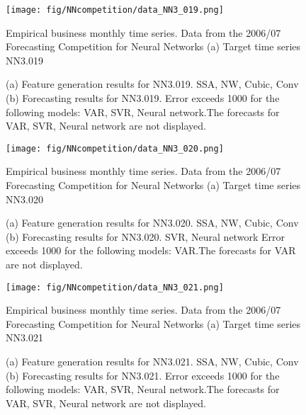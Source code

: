 \documentclass[12pt]{article}
\begin{document}
\begin{figure}
\centering
\texttt{[image: fig/NNcompetition/data\_NN3\_019.png]}
\caption{Empirical business monthly time series. Data from the 2006/07 Forecasting Competition for Neural Networks	(a) Target time series	NN3.019	}
\end{figure}


\begin{figure}
\centering
{}
\caption{(a)	Feature generation results for	NN3.019.	SSA, NW, Cubic, Conv	(b)	Forecasting results for	NN3.019.		Error exceeds 1000 for the following models: VAR, SVR, Neural network.The forecasts for VAR, SVR, Neural network are not displayed.	}
\end{figure}


\begin{figure}
\centering
\texttt{[image: fig/NNcompetition/data\_NN3\_020.png]}
\caption{Empirical business monthly time series. Data from the 2006/07 Forecasting Competition for Neural Networks	(a) Target time series	NN3.020	}
\end{figure}


\begin{figure}
\centering
{}
\caption{(a)	Feature generation results for	NN3.020.	SSA, NW, Cubic, Conv	(b)	Forecasting results for	NN3.020.	SVR, Neural network	Error exceeds 1000 for the following models: VAR.The forecasts for VAR are not displayed.	}
\end{figure}


\begin{figure}
\centering
\texttt{[image: fig/NNcompetition/data\_NN3\_021.png]}
\caption{Empirical business monthly time series. Data from the 2006/07 Forecasting Competition for Neural Networks	(a) Target time series	NN3.021	}
\end{figure}


\begin{figure}
\centering
{}
\caption{(a)	Feature generation results for	NN3.021.	SSA, NW, Cubic, Conv	(b)	Forecasting results for	NN3.021.		Error exceeds 1000 for the following models: VAR, SVR, Neural network.The forecasts for VAR, SVR, Neural network are not displayed.	}
\end{figure}
\end{document}
